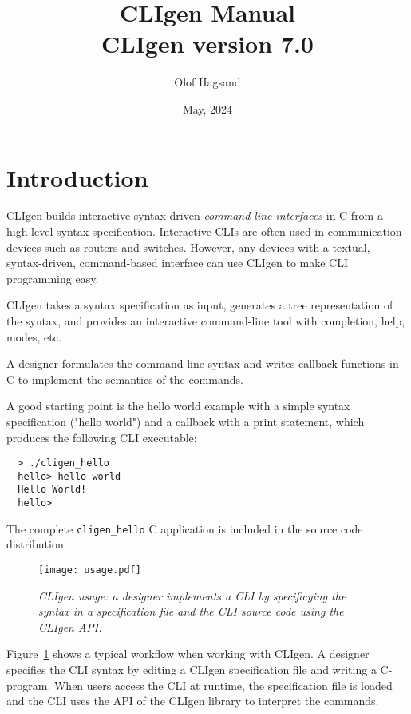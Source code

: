 \documentclass[a4paper, 10pt] {article}
\title {CLIgen Manual\\ {\small CLIgen version 7.0}}
\author{Olof Hagsand}
\begin{document}
\date{May, 2024}
\maketitle
\setcounter{tocdepth}{2}
\tableofcontents
\newpage
\section{Introduction}
\label{sec:intro}

CLIgen builds interactive syntax-driven \emph{command-line interfaces}
in C from a high-level syntax specification. Interactive CLIs are
often used in communication devices such as routers and
switches. However, any devices with a textual, syntax-driven,
command-based interface can use CLIgen to make CLI programming easy.

CLIgen takes a syntax specification as input, generates a tree
representation of the syntax, and provides an interactive command-line
tool with completion, help, modes, etc.

A designer formulates the command-line syntax and writes callback
functions in C to implement the semantics of the commands.

A good starting point is the hello world example with a simple syntax
specification ("hello world") and a callback with a print statement,
which produces the following CLI executable:

\begin{verbatim}
  > ./cligen_hello 
  hello> hello world 
  Hello World!
  hello> 
\end{verbatim}

The complete {\tt cligen\_hello} C application is included in the
source code distribution.

\begin{figure}
\centering
\texttt{[image: usage.pdf]}
\caption{\em CLIgen usage: a designer implements a CLI by specificying the syntax in a specification file and the CLI source code using the CLIgen API.}
\label{fig:usage}
\end{figure}

Figure~\ref{fig:usage} shows a typical workflow when working with
CLIgen. A designer specifies the CLI syntax by editing a CLIgen
specification file and writing a C-program. When users access the CLI
at runtime, the specification file is loaded and the CLI uses the API
of the CLIgen library to interpret the commands.
\end{document}
